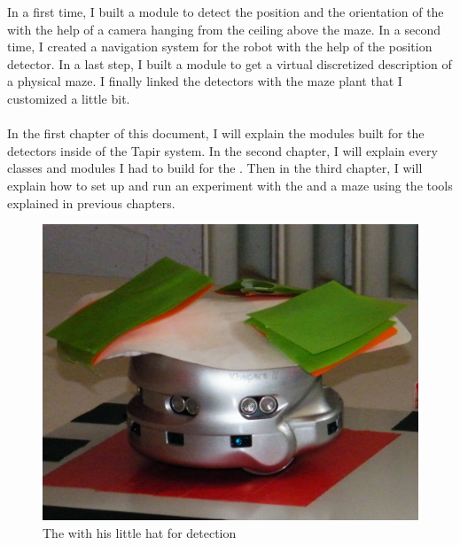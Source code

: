 In a first time, I built a module to detect the position and the 
orientation of the \khepera{} with the help of a camera hanging from 
the ceiling above the maze. In a second time, I created a navigation 
system for the robot with the help of the position detector. In a 
last step, I built a module to get a virtual discretized description 
of a physical maze. I finally linked the detectors with the maze plant 
that I customized a little bit.
\\
\\
In the first chapter of this document, I will explain the modules built 
for the detectors inside of the Tapir system. In the second chapter, 
I will explain every classes and modules I had to build for the \clsquare{}.
Then in the third chapter, I will explain how to set up and run an 
experiment with the \khepera{} and a maze using the tools explained 
in previous chapters. 

\begin{figure}
    \begin{center}
        \includegraphics[width=\textwidth]{./img/kheperacrop.png}
        \caption[The \khepera{}]{%
        The \khepera{} with his little hat for detection}
    \end{center}
\end{figure}
